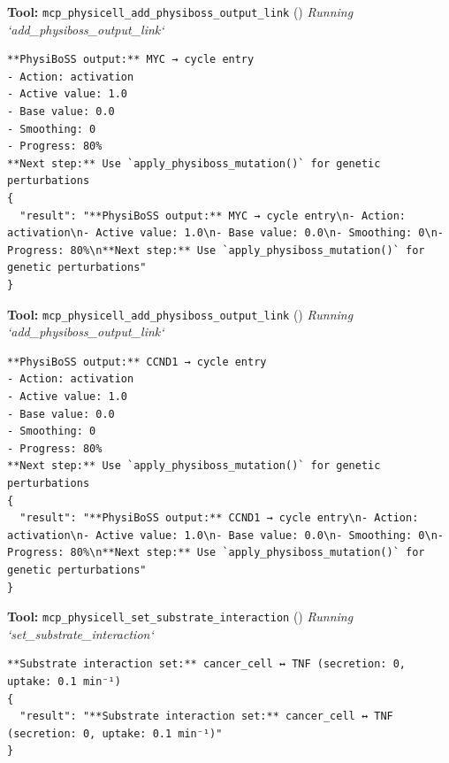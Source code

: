 \documentclass[11pt,a4paper]{article}
\begin{document}
\begin{toolokbox}
\textbf{Tool:} \texttt{mcp\_physicell\_add\_physiboss\_output\_link} (\checkmark)
\textit{Running `add\_physiboss\_output\_link`}
\begin{lstlisting}
**PhysiBoSS output:** MYC → cycle entry
- Action: activation
- Active value: 1.0
- Base value: 0.0
- Smoothing: 0
- Progress: 80%
**Next step:** Use `apply_physiboss_mutation()` for genetic perturbations
{
  "result": "**PhysiBoSS output:** MYC → cycle entry\n- Action: activation\n- Active value: 1.0\n- Base value: 0.0\n- Smoothing: 0\n- Progress: 80%\n**Next step:** Use `apply_physiboss_mutation()` for genetic perturbations"
}
\end{lstlisting}
\end{toolokbox}
\begin{toolokbox}
\textbf{Tool:} \texttt{mcp\_physicell\_add\_physiboss\_output\_link} (\checkmark)
\textit{Running `add\_physiboss\_output\_link`}
\begin{lstlisting}
**PhysiBoSS output:** CCND1 → cycle entry
- Action: activation
- Active value: 1.0
- Base value: 0.0
- Smoothing: 0
- Progress: 80%
**Next step:** Use `apply_physiboss_mutation()` for genetic perturbations
{
  "result": "**PhysiBoSS output:** CCND1 → cycle entry\n- Action: activation\n- Active value: 1.0\n- Base value: 0.0\n- Smoothing: 0\n- Progress: 80%\n**Next step:** Use `apply_physiboss_mutation()` for genetic perturbations"
}
\end{lstlisting}
\end{toolokbox}
\begin{toolokbox}
\textbf{Tool:} \texttt{mcp\_physicell\_set\_substrate\_interaction} (\checkmark)
\textit{Running `set\_substrate\_interaction`}
\begin{lstlisting}
**Substrate interaction set:** cancer_cell ↔ TNF (secretion: 0, uptake: 0.1 min⁻¹)
{
  "result": "**Substrate interaction set:** cancer_cell ↔ TNF (secretion: 0, uptake: 0.1 min⁻¹)"
}
\end{lstlisting}
\end{toolokbox}
\end{document}
